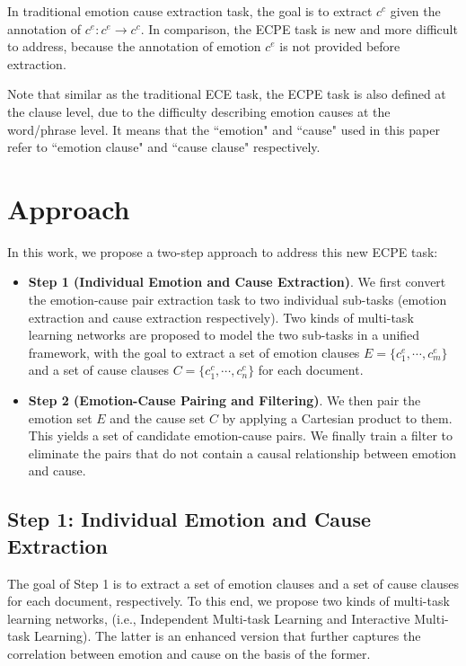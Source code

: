 \documentclass[11pt,a4paper]{article}
\begin{document}
In traditional emotion cause extraction task, the goal is to extract $ c^c $ given the annotation of $ c^e: c^e \rightarrow  c^c $. In comparison, the ECPE task is new and more difficult to address, because the annotation of emotion $ c^e $ is not provided before extraction.

Note that similar as the traditional ECE task, the ECPE task is also defined at the clause level, due to the difficulty describing emotion causes at the word/phrase level. It means that the ``emotion" and ``cause" used in this paper refer to ``emotion clause" and ``cause clause" respectively.


\section{Approach}
In this work, we propose a two-step approach to address this new ECPE task:


\begin{itemize}
	\item \textbf{Step 1 (Individual Emotion and Cause Extraction)}. We first convert the emotion-cause pair extraction task to two individual sub-tasks (emotion extraction and cause extraction respectively). Two kinds of multi-task learning networks are proposed to model the two sub-tasks in a unified framework, with the goal to extract a set of emotion clauses $ E=\{c_1^e,\cdots,c_m^e \} $ and a set of cause clauses $ C=\{c_1^c,\cdots,c_n^c \} $ for each document.
	\item \textbf{Step 2 (Emotion-Cause Pairing and Filtering)}. We then pair the emotion set $ E $ and the cause set $ C $ by applying a Cartesian product to them. This yields a set of candidate emotion-cause pairs. We finally train a filter to eliminate the pairs that do not contain a causal relationship between emotion and cause.
	
\end{itemize}



\subsection{Step 1: Individual Emotion and Cause Extraction}
The goal of Step 1 is to extract a set of emotion clauses and a set of cause clauses for each document, respectively. To this end, we propose two kinds of multi-task learning networks, (i.e., Independent Multi-task Learning and Interactive Multi-task Learning). The latter is an enhanced version that further captures the correlation between emotion and cause on the basis of the former.
\end{document}
